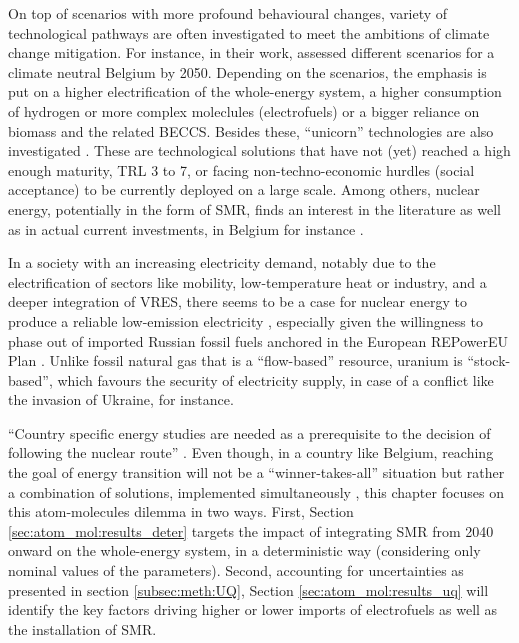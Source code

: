 On top of scenarios with more profound behavioural changes, variety of technological pathways are often investigated to meet the ambitions of climate change mitigation. For instance, in their work, \citet{My2050} assessed different scenarios for a climate neutral Belgium by 2050. Depending on the scenarios, the emphasis is put on a higher electrification of the whole-energy system, a higher consumption of hydrogen or more complex moleclules (\ie electrofuels) or a bigger reliance on biomass and the related \gls{BECCS}. Besides these, ``unicorn'' technologies are also investigated \cite{heuberger2018impact}. These are technological solutions that have not (yet) reached a high enough maturity, \ie TRL 3 to 7, or facing non-techno-economic hurdles (\ie social acceptance) to be currently deployed on a large scale. Among others, nuclear energy, potentially in the form of \acrfull{SMR}, finds an interest in the literature \cite{IEA_Nuclear_2022,PATHS2050} as well as in actual current investments, in Belgium for instance \cite{SMRlesoir}.

In a society with an increasing electricity demand, notably due to the electrification of sectors like mobility, low-temperature heat or industry, and a deeper integration of \gls{VRES}, there seems to be a case for nuclear energy to produce a reliable low-emission electricity \cite{IAEA2008}, especially given the willingness to phase out of imported Russian fossil fuels anchored in the European REPowerEU Plan \cite{REPowerEU}. Unlike fossil natural gas that is a ``flow-based'' resource, uranium is ``stock-based'', which favours the security of electricity supply, in case of a conflict like the invasion of Ukraine, for instance.

``Country specific energy studies are needed as a prerequisite to the decision of following the nuclear route'' \cite{IAEA2008}. Even though, in a country like Belgium, reaching the goal of energy transition will not be a ``winner-takes-all'' situation but rather a combination of solutions, implemented simultaneously \cite{Limpens2020}, this chapter focuses on this atom-molecules dilemma in two ways. First, Section \ref{sec:atom_mol:results_deter} targets the impact of integrating \gls{SMR} from 2040 onward on the whole-energy system, in a deterministic way (\ie considering only nominal values of the parameters). Second, accounting for uncertainties as presented in section \ref{subsec:meth:UQ}, Section \ref{sec:atom_mol:results_uq} will identify the key factors driving higher or lower imports of electrofuels as well as the installation of \gls{SMR}. 

